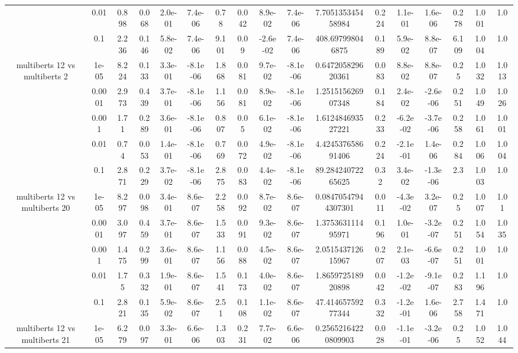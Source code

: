 \begin{tabular}{|c|c|c|c|c|c|c|c|c|c|c|c|c|c|c|c|c|}
 & 0.01 & 0.898 & 0.068 & 2.0e-01 & 7.4e-06 & 0.78 & 0.042 & 8.9e-02 & 7.4e-06 & 7.705135345458984 & 0.224 & 1.1e-01 & 1.6e-06 & 0.278 & 1.001 & 1.0 \\
 & 0.1 & 2.236 & 0.146 & 5.8e-02 & 7.4e-06 & 9.101 & 0.09 & -2.6e-02 & 7.4e-06 & 408.697998046875 & 0.189 & 5.9e-02 & 8.8e-07 & 6.109 & 1.004 & 1.0 \\
\hline
\multirow{5}{*}{multiberts 12 vs multiberts 2} & 1e-05 & 8.224 & 0.133 & 3.3e-01 & -8.1e-06 & 1.868 & 0.081 & 9.7e-02 & -8.1e-06 & 0.647205829620361 & 0.083 & 8.8e-02 & 8.8e-07 & 0.25 & 1.032 & 1.013 \\
 & 0.0001 & 2.973 & 0.439 & 3.7e-01 & -8.1e-06 & 1.156 & 0.081 & 8.9e-02 & -8.1e-06 & 1.251515626907348 & 0.184 & 2.4e-02 & -2.6e-06 & 0.251 & 1.049 & 1.026 \\
 & 0.001 & 1.71 & 0.289 & 3.6e-01 & -8.1e-06 & 0.807 & 0.05 & 6.1e-02 & -8.1e-06 & 1.612484693527221 & 0.233 & -6.2e-02 & -3.7e-06 & 0.258 & 1.061 & 1.001 \\
 & 0.01 & 0.74 & 0.053 & 1.4e-01 & -8.1e-06 & 0.769 & 0.072 & 4.9e-02 & -8.1e-06 & 4.424537658691406 & 0.224 & -2.1e-01 & 1.4e-06 & 0.284 & 1.006 & 1.004 \\
 & 0.1 & 2.871 & 0.229 & 3.7e-02 & -8.1e-06 & 2.875 & 0.083 & 4.4e-02 & -8.1e-06 & 89.28424072265625 & 0.32 & 3.4e-02 & -1.3e-06 & 2.3 & 1.003 & 1.0 \\
\hline
\multirow{5}{*}{multiberts 12 vs multiberts 20} & 1e-05 & 8.297 & 0.098 & 3.4e-01 & 8.6e-07 & 2.258 & 0.092 & 8.7e-02 & 8.6e-07 & 0.08470547944307301 & 0.011 & -4.3e-02 & 3.2e-07 & 0.25 & 1.007 & 1.01 \\
 & 0.0001 & 3.097 & 0.459 & 3.7e-01 & 8.6e-07 & 1.533 & 0.091 & 9.3e-02 & 8.6e-07 & 1.375363111495971 & 0.196 & 1.0e-01 & -3.2e-07 & 0.251 & 1.054 & 1.035 \\
 & 0.001 & 1.475 & 0.299 & 3.6e-01 & 8.6e-07 & 1.156 & 0.088 & 4.5e-02 & 8.6e-07 & 2.051543712615967 & 0.207 & 2.1e-03 & -6.6e-07 & 0.251 & 1.001 & 1.0 \\
 & 0.01 & 1.75 & 0.332 & 1.9e-01 & 8.6e-07 & 1.541 & 0.173 & 4.0e-02 & 8.6e-07 & 1.865972518920898 & 0.042 & -1.2e-02 & -9.1e-07 & 0.283 & 1.196 & 1.0 \\
 & 0.1 & 2.821 & 0.135 & 5.9e-02 & 8.6e-07 & 2.51 & 0.108 & 1.1e-02 & 8.6e-07 & 47.41465759277344 & 0.332 & -1.2e-01 & 1.6e-06 & 2.758 & 1.471 & 1.0 \\
\hline
\multirow{5}{*}{multiberts 12 vs multiberts 21} & 1e-05 & 6.279 & 0.097 & 3.3e-01 & 6.6e-06 & 1.303 & 0.231 & 7.7e-02 & 6.6e-06 & 0.25652164220809903 & 0.028 & -1.1e-01 & -3.2e-06 & 0.25 & 1.052 & 1.044 \\

\end{tabular}
